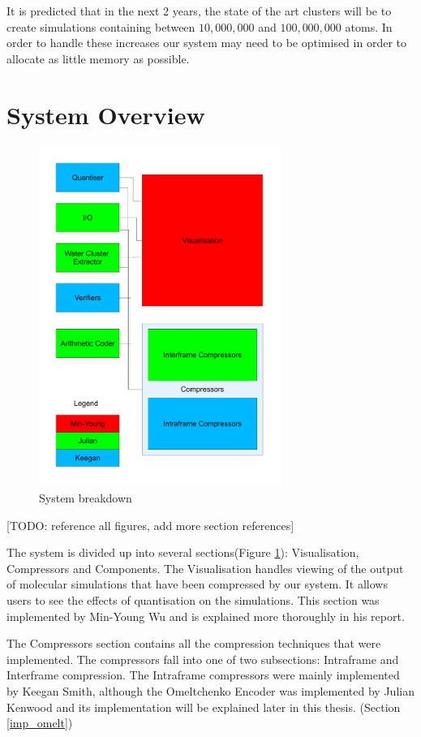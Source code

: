 \documentclass[a4paper,11pt]{report}
\begin{document}
It is predicted that in the next 2 years, the state of the art clusters will be to create simulations containing between $10,000,000$ and $100,000,000$ atoms. In order to handle these increases our system may need to be optimised in order to allocate as little memory as possible.


\section{System Overview}

\begin{figure}[h]
 \center
 \includegraphics[width=0.7\textwidth]{resources/Breakdown-connect.pdf}
\caption{System breakdown}
\label{sysbreak}
\end{figure}

[TODO: reference all figures, add more section references]

The system is divided up into several sections(Figure \ref{sysbreak}): Visualisation, Compressors and Components. The Visualisation handles viewing of the output of molecular simulations that have been compressed by our system. It allows users to see the effects of quantisation on the simulations. This section was implemented by Min-Young Wu and is explained more thoroughly in his report. 

The Compressors section contains all the compression techniques that were implemented. The compressors fall into one of two subsections: Intraframe and Interframe compression. The Intraframe compressors were mainly implemented by Keegan Smith, although the Omeltchenko Encoder was implemented by Julian Kenwood and its implementation will be explained later in this thesis. (Section \ref{imp_omelt})
\end{document}
